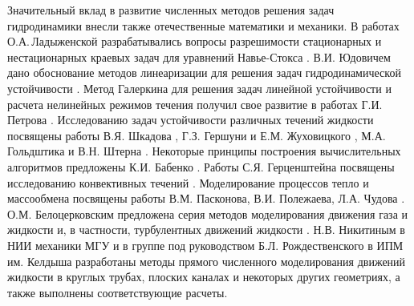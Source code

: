 Значительный вклад в развитие численных методов решения задач гидродинамики внесли также отечественные математики и механики. В работах О.А.\,Ладыженской разрабатывались вопросы разрешимости стационарных и нестационарных краевых задач для уравнений Навье-Стокса \cite{Lad1970}. В.И. Юдовичем дано обоснование методов линеаризации для решения задач гидродинамической устойчивости \cite{Jud1984}. Метод Галеркина для решения задач линейной устойчивости и расчета нелинейных режимов течения получил свое развитие в работах Г.И. Петрова \cite{Petrov1940}. Исследованию задач устойчивости различных течений жидкости посвящены работы В.Я. Шкадова \cite{Sch1973, Ach2009}, Г.З. Гершуни и Е.М. Жуховицкого \cite{Ger1972}, М.А. Гольдштика и В.Н. Штерна \cite{Gold1977}. Некоторые принципы построения вычислительных алгоритмов предложены К.И. Бабенко \cite{Bab2002}. Работы С.Я. Герценштейна посвящены исследованию конвективных течений \cite{Gerc1973, Gerc1975}. Моделирование процессов тепло и массообмена посвящены работы В.М. Пасконова, В.И. Полежаева, Л.А. Чудова \cite{Pask1984, Pol1987}. О.М. Белоцерковским предложена серия методов моделирования движения газа и жидкости и, в частности, турбулентных движений жидкости \cite{Bel1994}. Н.В. Никитиным в НИИ механики МГУ \cite{Nikitin1994a, Nikitin1994b, Nikitin1996, Nikitin2006} и в группе под руководством Б.Л. Рождественского в ИПМ им. Келдыша \cite{Rog1973, Rog1984, Pri1987, Rog1987} разработаны методы прямого численного моделирования движений жидкости в круглых трубах, плоских каналах и некоторых других геометриях, а также выполнены соответствующие расчеты. 

